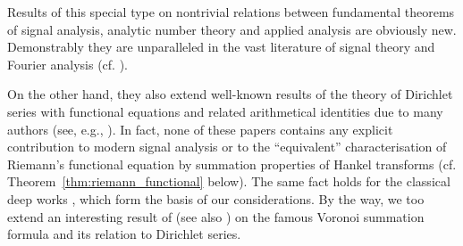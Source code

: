 \documentclass{article}
\begin{document}
Results of this special type on nontrivial relations between fundamental
theorems of signal analysis, analytic number theory and applied analysis are
obviously new. Demonstrably they are unparalleled in the vast literature of
signal theory and Fourier analysis (cf. {\cite{8,21}}).

On the other hand, they also extend well-known results of the theory of
Dirichlet series with functional equations and related arithmetical identities
due to many authors (see, e.g., {\cite{2,3,4,11,12,13,14,22}}). In fact, none
of these papers contains any explicit contribution to modern signal analysis
or to the ``equivalent'' characterisation of Riemann's functional equation by
summation properties of Hankel transforms (cf.
Theorem~\ref{thm:riemann_functional} below). The same fact holds for the
classical deep works {\cite{15,17,19,20,27,29}}, which form the basis of our
considerations. By the way, we too extend an interesting result of {\cite{18}}
(see also {\cite{1,26}}) on the famous Voronoi summation formula and its
relation to Dirichlet series.
\end{document}
